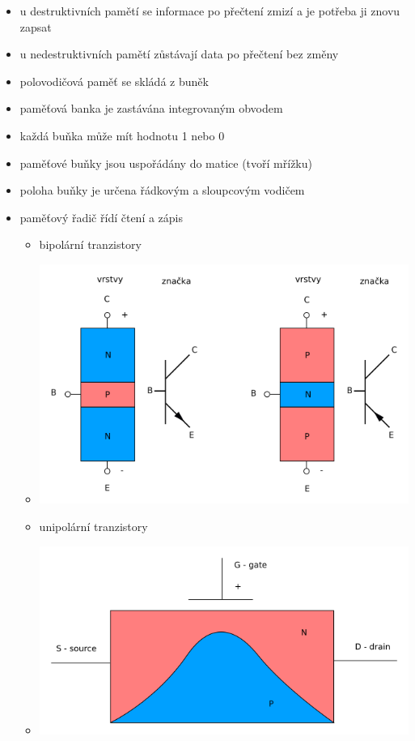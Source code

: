 \documentclass[a4paper,12pt]{article}
\providecommand{\tightlist}{%
\setlength{\itemsep}{0pt}\setlength{\parskip}{0pt}}
\begin{document}
\begin{itemize}
\tightlist
\item u destruktivních pamětí se informace po přečtení zmizí a je potřeba ji
  znovu zapsat
\item u nedestruktivních pamětí zůstávají data po přečtení bez změny
\item polovodičová paměť se skládá z buněk
\item paměťová banka je zastávána integrovaným obvodem
\item každá buňka může mít hodnotu 1 nebo 0
\item paměťové buňky jsou uspořádány do matice (tvoří mřížku)
\item poloha buňky je určena řádkovým a sloupcovým vodičem
\item paměťový řadič řídí čtení a zápis

  \begin{itemize}
  \tightlist
  \item bipolární tranzistory
  \item[] \includegraphics[width=15.529cm]{ref/bipolarni-transistory.png}
  \item unipolární tranzistory
  \item[] \includegraphics[width=15.73cm]{ref/unipolarni-tranzistor.png}
  \end{itemize}
\end{itemize}
\end{document}
